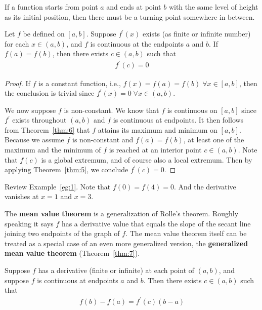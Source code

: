 \documentclass[thmcnt=section, 12pt]{my-elegantbook}
\begin{document}
\par If a function starts from point $a$ and ends at point $b$ with the same level of height as its initial position, then there must be a turning point somewhere in between.

\begin{theorem}[Rolle] \label{thm:9}
    Let $f$ be defined on $[a, b]$. Suppose $f^\prime(x)$ exists (as finite or infinite number) for each $x \in (a, b)$, and $f$ is continuous at the endpoints $a$ and $b$. If $f(a) = f(b)$, then there exists $c \in (a, b)$ such that
    \begin{align*}
        f^\prime(c) = 0
    \end{align*}
\end{theorem}

\begin{proof}
    If $f$ is a constant function, i.e., $f(x) = f(a) = f(b) \; \forall x \in [a, b]$, then the conclusion is trivial since $f^\prime(x) = 0 \; \forall x \in (a, b)$.

    We now suppose $f$ is non-constant. We know that $f$ is continuous on $[a, b]$ since $f^\prime$ exists throughout $(a, b)$ and $f$ is continuous at endpoints. It then follows from Theorem~\ref{thm:6} that $f$ attains its maximum and minimum on $[a, b]$. Because we assume $f$ is non-constant and $f(a) = f(b)$, at least one of the maximum and the minimum of $f$ is reached at an interior point $c \in (a, b)$. Note that $f(c)$ is a global extremum, and of course also a local extremum. Then by applying Theorem~\ref{thm:5}, we conclude $f^\prime(c) = 0$.
\end{proof}

\begin{example}
    Review Example~\ref{eg:1}. Note that $f(0) = f(4) = 0$. And the derivative vanishes at $x = 1$ and $x = 3$.
\end{example}


\par The \textbf{mean value theorem} is a generalization of Rolle's theorem. Roughly speaking it says $f$ has a derivative value that equals the slope of the secant line joining two endpoints of the graph of $f$. The mean value theorem itself can be treated as a special case of an even more generalized version, the \textbf{generalized mean value theorem} (Theorem~\ref{thm:7}).

\begin{theorem} \label{thm:8}
    Suppose $f$ has a derivative (finite or infinite) at each point of $(a, b)$, and suppose $f$ is continuous at endpoints $a$ and $b$. Then there exists $c \in (a, b)$ such that
    \begin{align*}
        f(b) - f(a) = f^\prime(c) (b - a)
    \end{align*}
\end{theorem}
\end{document}
